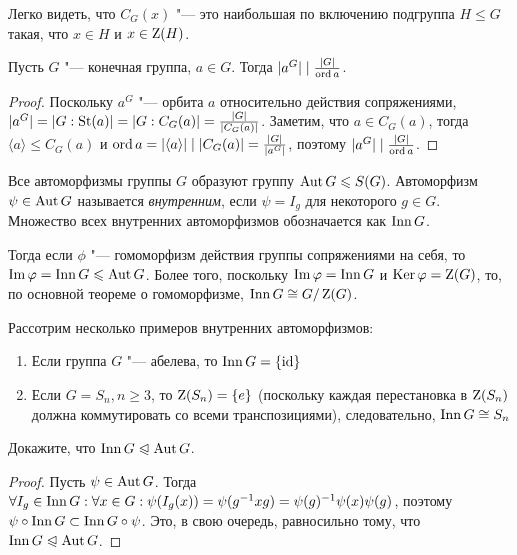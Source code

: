 \begin{note}
	Легко видеть, что $C_G(x)$ "--- это наибольшая по включению подгруппа $H \le G$ такая, что $x \in H$ и $x \in \operatorname{Z}(H)$.
\end{note}

\begin{proposition}
	Пусть $G$ "--- конечная группа, $a \in G$. Тогда $|a^G| \mid \frac{|G|}{\operatorname{ord} a}$.
\end{proposition}

\begin{proof}
	Поскольку $a^G$ "--- орбита $a$ относительно действия сопряжениями, $|a^G| \hm= |G : \St(a)| = |G : C_G(a)| = \frac{|G|}{|C_G(a)|}$. Заметим, что $a \in C_G(a)$, тогда $\langle a \rangle \le C_G(a)$ и $\ord{a} \hm= |\langle a \rangle| \mid |C_G(a)| = \frac{|G|}{|a^G|}$, поэтому $|a^G| \mid \frac{|G|}{\operatorname{ord} a}$.
\end{proof}

\begin{definition}
	Все автоморфизмы группы $G$ образуют группу $\operatorname{Aut} G \leqslant S(G)$. Автоморфизм $\psi \in \operatorname{Aut} G$ называется \textit{внутренним}, если $\psi = I_g$ для некоторого $g \in G$. Множество всех внутренних автоморфизмов обозначается как $\operatorname{Inn} G$.
\end{definition}

\begin{note}
	 Тогда если $\phi$ "--- гомоморфизм действия группы сопряжениями на себя, то $\im\phi \hm= \Inn G \le \Aut G$. Более того, поскольку $\operatorname{Im}\varphi = \operatorname{Inn} G$ и $\operatorname{Ker}\varphi = \operatorname{Z}(G)$, то, по основной теореме о гомоморфизме, $\operatorname{Inn} G \cong G / \operatorname{Z}(G)$.
\end{note}

\begin{example}
	Рассотрим несколько примеров внутренних автоморфизмов:
	\begin{enumerate}
		\item Если группа $G$ "--- абелева, то $\operatorname{Inn}{G} = \{\operatorname{id}\}$
		\item Если $G = S_n, n \ge 3$, то $\operatorname{Z}(S_n) = \{e\}$ (поскольку каждая перестановка в $\operatorname{Z}(S_n)$ должна коммутировать со всеми транспозициями), следовательно, $\operatorname{Inn}{G} \cong S_n$
	\end{enumerate}
\end{example}

\begin{exercise}
	Докажите, что $\operatorname{Inn}{G} \trianglelefteqslant \operatorname{Aut}{G}$.
\end{exercise}

\begin{proof}
	Пусть $\psi \in \operatorname{Aut}{G}$. Тогда $\forall I_g \in \Inn{G}: \forall x \hm\in G: \psi(I_g(x)) = \psi(g^{-1}xg) \hm= \psi(g)^{-1}\psi(x)\psi(g)$, поэтому $\psi\circ\operatorname{Inn}{G} \subset \operatorname{Inn}{G}\circ\psi$. Это, в свою очередь, равносильно тому, что $\operatorname{Inn}{G} \trianglelefteqslant \operatorname{Aut}{G}$.
\end{proof}

